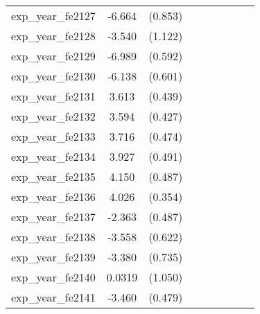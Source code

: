 {\begin{tabular}{l*{4}{cc}}
exp\_year\_fe2127&   -6.664\sym{***}&  (0.853)&                  &         &                  &         &                  &         \\
exp\_year\_fe2128&   -3.540\sym{**} &  (1.122)&                  &         &                  &         &                  &         \\
exp\_year\_fe2129&   -6.989\sym{***}&  (0.592)&                  &         &                  &         &                  &         \\
exp\_year\_fe2130&   -6.138\sym{***}&  (0.601)&                  &         &                  &         &                  &         \\
exp\_year\_fe2131&    3.613\sym{***}&  (0.439)&                  &         &                  &         &                  &         \\
exp\_year\_fe2132&    3.594\sym{***}&  (0.427)&                  &         &                  &         &                  &         \\
exp\_year\_fe2133&    3.716\sym{***}&  (0.474)&                  &         &                  &         &                  &         \\
exp\_year\_fe2134&    3.927\sym{***}&  (0.491)&                  &         &                  &         &                  &         \\
exp\_year\_fe2135&    4.150\sym{***}&  (0.487)&                  &         &                  &         &                  &         \\
exp\_year\_fe2136&    4.026\sym{***}&  (0.354)&                  &         &                  &         &                  &         \\
exp\_year\_fe2137&   -2.363\sym{***}&  (0.487)&                  &         &                  &         &                  &         \\
exp\_year\_fe2138&   -3.558\sym{***}&  (0.622)&                  &         &                  &         &                  &         \\
exp\_year\_fe2139&   -3.380\sym{***}&  (0.735)&                  &         &                  &         &                  &         \\
exp\_year\_fe2140&   0.0319         &  (1.050)&                  &         &                  &         &                  &         \\
exp\_year\_fe2141&   -3.460\sym{***}&  (0.479)&                  &         &                  &         &                  &         \\

\end{tabular}}
